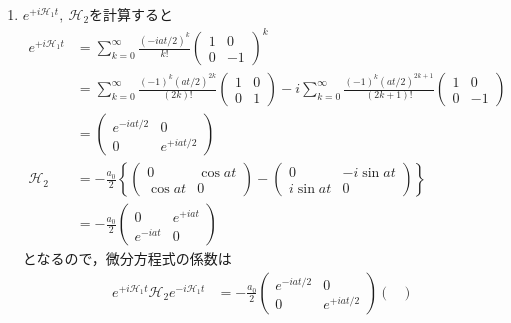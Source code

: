 \documentclass[a4paper,pdflatex,ja=standard]{bxjsarticle}
\begin{document}
\begin{enumerate}
  \item 

  $e^{+i\mathcal{H}_1t},\ \mathcal{H}_2$を計算すると
  \begin{align}
    e^{+i\mathcal{H}_1t}
    &=
    \sum_{k=0}^{\infty}
    \frac{(-iat/2)^k}{k!}
    \begin{pmatrix}
      1 & 0 \\
      0 & -1
    \end{pmatrix}^k
    \nonumber
    \\
    &=
    \sum_{k=0}^{\infty}
    \frac{(-1)^k(at/2)^{2k}}{(2k)!}
    \begin{pmatrix}
      1 & 0 \\
      0 & 1
    \end{pmatrix}
    -
    i
    \sum_{k=0}^{\infty}
    \frac{(-1)^k(at/2)^{2k+1}}{(2k+1)!}
    \begin{pmatrix}
      1 & 0 \\
      0 & -1
    \end{pmatrix}
    \nonumber
    \\
    &=
    \begin{pmatrix}
      e^{-iat/2} & 0 \\
      0 & e^{+iat/2}
    \end{pmatrix}
    \\
    \mathcal{H}_2
    &=
    -\frac{a_0}{2}
    \left\{  
      \begin{pmatrix}
        0 & \cos at \\
        \cos at & 0
      \end{pmatrix}
      -
      \begin{pmatrix}
        0 & -i\sin at \\
        i\sin at & 0
      \end{pmatrix}      
    \right\}
    \nonumber
    \\
    &=
    -\frac{a_0}{2}
    \begin{pmatrix}
      0 & e^{+ia t} \\
      e^{-iat} & 0
    \end{pmatrix}
  \end{align}
  となるので，微分方程式の係数は
  \begin{align}
    e^{+i\mathcal{H}_1t}
    \mathcal{H}_2
    e^{-i\mathcal{H}_1t}
    &=
    -\frac{a_0}{2}
    \begin{pmatrix}
      e^{-iat/2} & 0 \\
      0 & e^{+iat/2}
    \end{pmatrix}
    \begin{pmatrix}

\end{pmatrix}
\end{align}
\end{enumerate}
\end{document}
